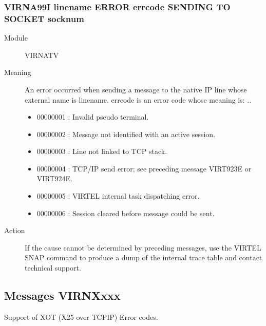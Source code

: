 \documentclass[letterpaper,10pt,english]{sphinxmanual}
\begin{document}
\subsubsection{VIRNA99I linename ERROR errcode SENDING TO SOCKET socknum}
\label{\detokenize{messages:virna99i-linename-error-errcode-sending-to-socket-socknum}}\begin{description}
\item[{Module}] \leavevmode
VIRNATV

\item[{Meaning}] \leavevmode
An error occurred when sending a message to the native IP line whose external name is linename. errcode is an error code whose meaning is:
..
\begin{itemize}
\item {} 
00000001 : Invalid pseudo terminal.

\item {} 
00000002 : Message not identified with an active session.

\item {} 
00000003 : Line not linked to TCP stack.

\item {} 
00000004 : TCP/IP send error; see preceding message VIRT923E or VIRT924E.

\item {} 
00000005 : VIRTEL internal task dispatching error.

\item {} 
00000006 : Session cleared before message could be sent.

\end{itemize}

\item[{Action}] \leavevmode
If the cause cannot be determined by preceding messages, use the VIRTEL SNAP command to produce a dump of the internal trace table and contact technical support.

\end{description}


\subsection{Messages VIRNXxxx}
\label{\detokenize{messages:messages-virnxxxx}}
Support of XOT (X25 over TCPIP) Error codes.
\end{document}
